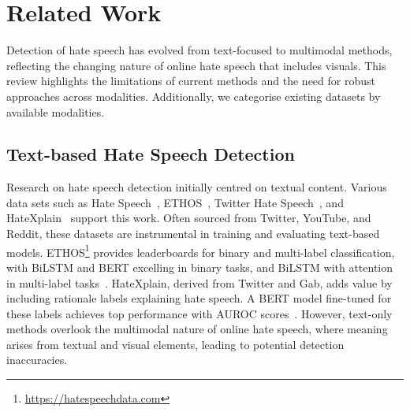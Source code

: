 \section{Related Work}
Detection of hate speech has evolved from text-focused to multimodal methods, reflecting the changing nature of online hate speech that includes visuals. This review highlights the limitations of current methods and the need for robust approaches across modalities. Additionally, we categorise existing datasets by available modalities.


\subsection{Text-based Hate Speech Detection}
Research on hate speech detection initially centred on textual content. Various data sets such as Hate Speech~\citep{de2018hate}, ETHOS~\citep{mollas2020ethos}, Twitter Hate Speech~\citep{waseem2016hateful}, and HateXplain~\citep{mathew2021hatexplain, chhabra2023literature} support this work. Often sourced from Twitter, YouTube, and Reddit, these datasets are instrumental in training and evaluating text-based models. ETHOS\footnote{\url{https://hatespeechdata.com}} provides leaderboards for binary and multi-label classification, with BiLSTM and BERT excelling in binary tasks, and BiLSTM with attention in multi-label tasks~\citep{mollas2020ethos}. HateXplain, derived from Twitter and Gab, adds value by including rationale labels explaining hate speech. A BERT model fine-tuned for these labels achieves top performance with AUROC scores~\citep{mathew2021hatexplain}. However, text-only methods overlook the multimodal nature of online hate speech, where meaning arises from textual and visual elements, leading to potential detection inaccuracies.

